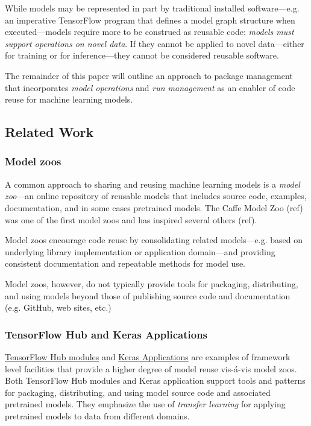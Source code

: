 \documentclass{article}
\begin{document}
While models may be represented in part by traditional installed
software---e.g. an imperative TensorFlow program that defines a model
graph structure when executed---models require more to be construed as
reusable code: \emph{models must support operations on novel data}. If
they cannot be applied to novel data---either for training or for
inference---they cannot be considered reusable software.

The remainder of this paper will outline an approach to package
management that incorporates \emph{model operations} and \emph{run
  management} as an enabler of code reuse for machine learning models.

\subsection{Related Work}

\subsubsection{Model zoos}

A common approach to sharing and reusing machine learning models is a
\emph{model zoo}---an online repository of reusable models that
includes source code, examples, documentation, and in some cases
pretrained models. The Caffe Model Zoo (ref) was one of the first
model zoos and has inspired several others (ref).

Model zoos encourage code reuse by consolidating related
models---e.g. based on underlying library implementation or
application domain---and providing consistent documentation and
repeatable methods for model use.

Model zoos, however, do not typically provide tools for packaging,
distributing, and using models beyond those of publishing source code
and documentation (e.g. GitHub, web sites, etc.)

\subsubsection{TensorFlow Hub and Keras Applications}

\href{https://www.tensorflow.org/hub/}{TensorFlow Hub modules} and
\href{https://keras.io/applications/}{Keras Applications} are examples
of framework level facilities that provide a higher degree of model
reuse vis-\'a-vis model zoos. Both TensorFlow Hub modules and Keras
application support tools and patterns for packaging, distributing,
and using model source code and associated pretrained models. They
emphasize the use of \emph{transfer learning} for applying pretrained
models to data from different domains.
\end{document}

